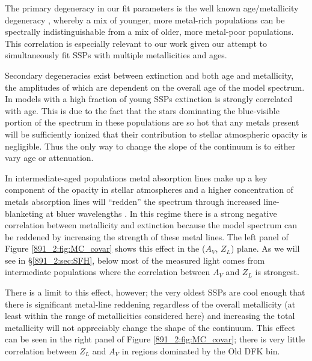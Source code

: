 The primary degeneracy in our fit parameters is the well known
age/metallicity degeneracy \citep[see, for
example,][]{Oconnel76,Aaronson78,Worthey94,dePaz02}, whereby a mix of
younger, more metal-rich populations can be spectrally
indistinguishable from a mix of older, more metal-poor
populations. This correlation is especially relevant to our work given
our attempt to simultaneously fit SSPs with multiple metallicities and
ages.

Secondary degeneracies exist between extinction and both age and
metallicity, the amplitudes of which are dependent on the overall age
of the model spectrum. In models with a high fraction of young SSPs
extinction is strongly correlated with age. This is due to the fact
that the stars dominating the blue-visible portion of the spectrum in
these populations are so hot that any metals present will be
sufficiently ionized that their contribution to stellar atmospheric
opacity is negligible. Thus the only way to change the slope of the
continuum is to either vary age or attenuation.


In intermediate-aged populations metal absorption lines make up a key
component of the opacity in stellar atmospheres and a higher
concentration of metals absorption lines will ``redden'' the spectrum
through increased line-blanketing at bluer wavelengths \citep[see,
e.g., Figure 4 in ][]{Vazdekis10}. In this regime there is a strong
negative correlation between metallicity and extinction because the
model spectrum can be reddened by increasing the strength of these
metal lines. The left panel of Figure \ref{891_2:fig:MC_covar} shows
this effect in the ($A_V$, $Z_L$) plane. As we will see in
\S\ref{891_2:sec:SFH}, below  most of the measured light
comes from intermediate populations where the correlation between
$A_V$ and $Z_L$ is strongest.

There is a limit to this effect, however; the very oldest SSPs are
cool enough that there is significant metal-line reddening regardless
of the overall metallicity (at least within the range of metallicities
considered here) and increasing the total metallicity will not
appreciably change the shape of the continuum. This effect can be seen
in the right panel of Figure \ref{891_2:fig:MC_covar}; there is very little
correlation between $Z_L$ and $A_V$ in regions dominated by the Old
DFK bin.

